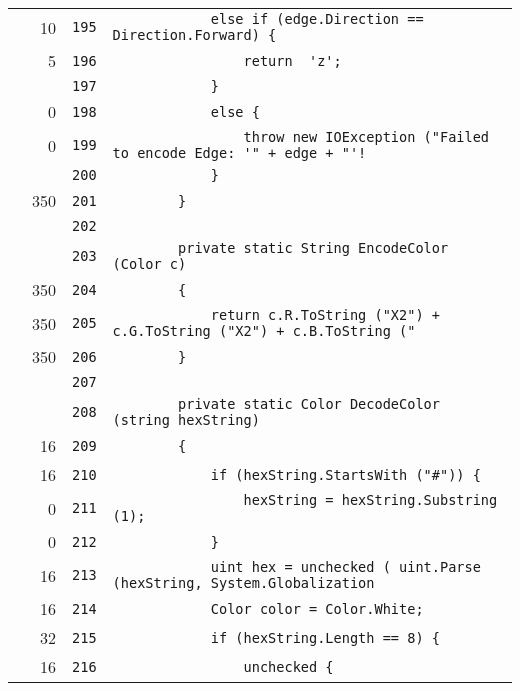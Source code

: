 \documentclass[a4paper,10pt]{article}
\begin{document}
\begin{longtable}[l]{lrrl}
\cellcolor{green} & 10 & \verb~195~ & \verb~            else if (edge.Direction == Direction.Forward) {~\\
\cellcolor{green} & 5 & \verb~196~ & \verb~                return  'z';~\\
\cellcolor{gray} &  & \verb~197~ & \verb~            }~\\
\cellcolor{red} & 0 & \verb~198~ & \verb~            else {~\\
\cellcolor{red} & 0 & \verb~199~ & \verb~                throw new IOException ("Failed to encode Edge: '" + edge + "'!~\\
\cellcolor{gray} &  & \verb~200~ & \verb~            }~\\
\cellcolor{green} & 350 & \verb~201~ & \verb~        }~\\
\cellcolor{gray} &  & \verb~202~ & \verb~~\\
\cellcolor{gray} &  & \verb~203~ & \verb~        private static String EncodeColor (Color c)~\\
\cellcolor{green} & 350 & \verb~204~ & \verb~        {~\\
\cellcolor{green} & 350 & \verb~205~ & \verb~            return c.R.ToString ("X2") + c.G.ToString ("X2") + c.B.ToString ("~\\
\cellcolor{green} & 350 & \verb~206~ & \verb~        }~\\
\cellcolor{gray} &  & \verb~207~ & \verb~~\\
\cellcolor{gray} &  & \verb~208~ & \verb~        private static Color DecodeColor (string hexString)~\\
\cellcolor{green} & 16 & \verb~209~ & \verb~        {~\\
\cellcolor{green} & 16 & \verb~210~ & \verb~            if (hexString.StartsWith ("#")) {~\\
\cellcolor{red} & 0 & \verb~211~ & \verb~                hexString = hexString.Substring (1);~\\
\cellcolor{red} & 0 & \verb~212~ & \verb~            }~\\
\cellcolor{green} & 16 & \verb~213~ & \verb~            uint hex = unchecked ( uint.Parse (hexString, System.Globalization~\\
\cellcolor{green} & 16 & \verb~214~ & \verb~            Color color = Color.White;~\\
\cellcolor{green} & 32 & \verb~215~ & \verb~            if (hexString.Length == 8) {~\\
\cellcolor{green} & 16 & \verb~216~ & \verb~                unchecked {~\\

\end{longtable}
\end{document}
